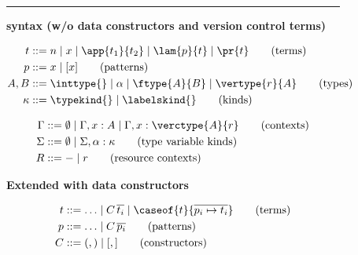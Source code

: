 \begin{figure}[tb]
    \hrule
    \medskip
    \begin{minipage}{.9\textwidth}
        \textbf{\vlmini{} syntax (w/o data constructors and version control terms)}
    \end{minipage}
    \begin{minipage}{\textwidth}
        \vspace{-.8\baselineskip}
        \begin{minipage}{.475\textwidth}
          \begin{align*}
            t & ::= n \mid x \mid \app{t_1}{t_2} \mid \lam{p}{t} \mid \pr{t} \tag{terms}\\
            p & ::= x \mid [x] \tag{patterns}\\
            A, B & ::= \inttype{} \mid \alpha \mid \ftype{A}{B} \mid \vertype{r}{A} \tag{types}\\
            \kappa & ::= \typekind{} \mid \labelskind{} \tag{kinds}
          \end{align*}
        \end{minipage}
        \begin{minipage}{.475\textwidth}
          \begin{align*}
            \Gamma & ::= \emptyset \mid \Gamma, x:A \mid \Gamma, x:\verctype{A}{r} \tag{contexts}\\
            \Sigma & ::= \emptyset \mid \Sigma, \alpha:\kappa \tag{type variable kinds}\\
            R      & ::= - \mid r \tag{resource contexts}\\
          \end{align*}
        \end{minipage}
    \end{minipage}
    \begin{minipage}{.9\textwidth}
        \medskip\textbf{Extended with data constructors}
    \end{minipage}
    \begin{minipage}{\textwidth}
        \vspace{-.5\baselineskip}
        \begin{minipage}{.52\textwidth}
          \begin{align*}
            t & ::= \ldots \mid C\,\overline{t_i} \mid \caseof{t}{\overline{p_i \mapsto t_i}}\tag{terms}\\
            p & ::= \ldots \mid C\,\overline{p_i} \tag{patterns}\\
            C & ::= (,) \mid [,] \tag{constructors}

\end{align*}
\end{minipage}
\end{minipage}
\end{figure}
